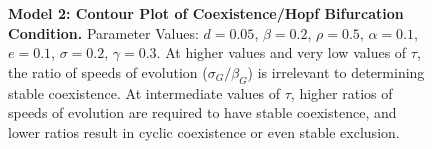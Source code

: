 \documentclass{amsart}
\theoremstyle{definition}
\theoremstyle{remark}
\numberwithin{equation}{section}
\begin{document}
\begin{centering}
\begin{figure}[h]
{		}
		\caption{\footnotesize {\bf Model 2: Contour Plot of Coexistence/Hopf Bifurcation Condition.} Parameter Values: $d = 0.05$, $\beta = 0.2$, $\rho = 0.5$, $\alpha = 0.1$, $e = 0.1$, $\sigma = 0.2$, $\gamma = 0.3$.  At higher values and very low values of $\tau$, the ratio of speeds of evolution ($\sigma_G/\beta_G$) is irrelevant to determining stable coexistence.  At intermediate values of $\tau$, higher ratios of speeds of evolution are required to have stable coexistence, and lower ratios result in cyclic coexistence or even stable exclusion.}
		\label{fig:contour_plot}
	\end{figure}
	\begin{figure}[h]
		\makebox[\linewidth][c]{%
			\centering
}
\end{figure}
\end{centering}
\end{document}
